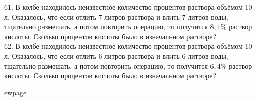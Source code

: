 61.  В колбе находилось неизвестное количество процентов раствора объёмом 10 л. Оказалось, что
если отлить 7 литров раствора и влить 7 литров воды, тщательно размешать, а потом повторить
операцию, то получится $8,1\%$ раствор кислоты. Сколько процентов кислоты было в изначальном растворе?\\
62. В колбе находилось неизвестное количество процентов раствора объёмом 10 л. Оказалось, что
если отлить 6 литров раствора и влить 6 литров воды, тщательно размешать, а потом повторить
операцию, то получится $6,4\%$ раствор кислоты. Сколько процентов кислоты было в изначальном
растворе?

ewpage
